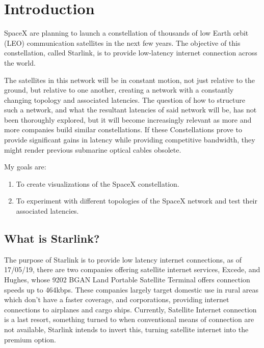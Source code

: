 \documentclass[12pt]{report}
\begin{document}
\chapter{Introduction}

SpaceX are planning to launch a constellation of thousands of low Earth orbit (LEO) communication satellites in the next few years. The objective of this constellation, called Starlink, is to provide low-latency internet connection across the world.

The satellites in this network will be in constant motion, not just relative to the ground, but relative to one another, creating a network with a constantly changing topology and associated latencies. The question of how to structure such a network, and what the resultant latencies of said network will be, has not been thoroughly explored, but it will become increasingly relevant as more and more companies build similar constellations. If these Constellations prove to provide significant gains in latency while providing competitive bandwidth, they might render previous submarine optical cables obsolete.

My goals are:
\begin{enumerate}
	\item To create visualizations of the SpaceX constellation.
	\item To experiment with different topologies of the SpaceX network and test their associated latencies. 
\end{enumerate}

\section{What is Starlink?}

The purpose of Starlink is to provide low latency internet connections, as of 17/05/19, there are two companies offering satellite internet services, Excede\cite{ExcedeWebsite}, and Hughes, whose 9202 BGAN Land Portable Satellite Terminal offers connection speeds up to 464kbps\cite{HughesWebsite}. These companies largely target domestic use in rural areas which don’t have a faster coverage, and corporations, providing internet connections to airplanes and cargo ships. Currently, Satellite Internet connection is a last resort, something turned to when conventional means of connection are not available, Starlink intends to invert this, turning satellite internet into the premium option. 
\end{document}

